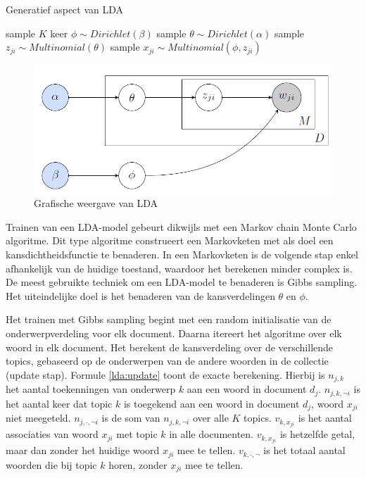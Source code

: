 \begin{algorithm}
\caption{Generatief aspect van LDA}
\begin{algorithmic} 
\STATE sample $K$ keer  $\phi \sim Dirichlet(\beta)$
\STATE sample $\theta \sim Dirichlet(\alpha)$
\STATE sample $z_{ji} \sim Multinomial(\theta)$
\STATE sample $x_{ji} \sim Multinomial(\phi,z_{ji})$
\ENDFOR
\ENDFOR
\end{algorithmic}
\label{algo:lda}
\end{algorithm}
                                  
\begin{figure}[tb]
    \centering
    \includegraphics[width=\linewidth]{Images/lda.png}
    \caption{Grafische weergave van LDA}
    \label{fig:lda}
\end{figure}

Trainen van een LDA-model gebeurt dikwijls met een Markov chain Monte Carlo algoritme. Dit type algoritme construeert een Markovketen met als doel een kansdichtheidsfunctie te benaderen. In een Markovketen is de volgende stap enkel afhankelijk van de huidige toestand, waardoor het berekenen minder complex is. De meest gebruikte techniek om een LDA-model te benaderen is Gibbs sampling. Het uiteindelijke doel is het benaderen van de kansverdelingen $\theta$ en $\phi$.

Het trainen met Gibbs sampling begint met een random initialisatie van de onderwerpverdeling voor elk document. Daarna itereert het algoritme over elk woord in elk document. Het berekent de kansverdeling over de verschillende topics, gebaseerd op de onderwerpen van de andere woorden in de collectie (update stap). Formule \eqref{lda:update} toont de exacte berekening. Hierbij is $n_{j,k}$ het aantal toekenningen van onderwerp $k$ aan een woord in document $d_j$. $n_{j,k,\neg i}$ is het aantal keer dat topic $k$ is toegekend aan een woord in document $d_j$, woord $x_{ji}$ niet meegeteld. $n_{j,\cdot,\neg i}$ is de som van $n_{j,k,\neg i}$ over alle $K$ topics. $v_{k,x_{ji}}$ is het aantal associaties van woord $x_{ji}$ met topic $k$ in alle documenten. $v_{k,x_{ji}}$ is hetzelfde getal, maar dan zonder het huidige woord $x_{ji}$ mee te tellen. $v_{k,\cdot,\neg}$ is het totaal aantal woorden die bij topic $k$ horen, zonder $x_{ji}$ mee te tellen.

